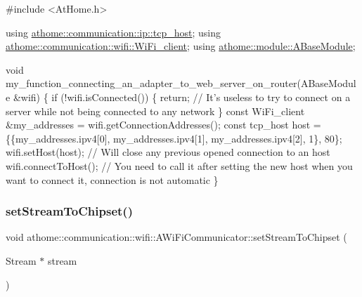 \begin{DoxyCode}
\textcolor{preprocessor}{#include <AtHome.h>}

\textcolor{keyword}{using} \mbox{\hyperlink{structathome_1_1communication_1_1ip_1_1s__host}{athome::communication::ip::tcp\_host}};
\textcolor{keyword}{using} \mbox{\hyperlink{structathome_1_1communication_1_1wifi_1_1s__wifi__client}{athome::communication::wifi::WiFi\_client}};
\textcolor{keyword}{using} \mbox{\hyperlink{classathome_1_1module_1_1_a_base_module}{athome::module::ABaseModule}};

\textcolor{keywordtype}{void} my\_function\_connecting\_an\_adapter\_to\_web\_server\_on\_router(ABaseModule &wifi) \{
  \textcolor{keywordflow}{if} (!wifi.isConnected()) \{
    \textcolor{keywordflow}{return}; \textcolor{comment}{// It's useless to try to connect on a server while not being connected to any network}
  \}
  \textcolor{keyword}{const} WiFi\_client &my\_addresses = wifi.getConnectionAddresses();
  \textcolor{keyword}{const} tcp\_host host = \{\{my\_addresses.ipv4[0], my\_addresses.ipv4[1], my\_addresses.ipv4[2], 1\}, 80\};
  wifi.setHost(host); \textcolor{comment}{// Will close any previous opened connection to an host}
  wifi.connectToHost(); \textcolor{comment}{// You need to call it after setting the new host when you want to connect it,
       connection is not automatic}
\}
\end{DoxyCode}
 \mbox{\label{classathome_1_1communication_1_1wifi_1_1_a_wi_fi_communicator_a42f2ad88713db57bd9e9670f090924de}} 
\subsubsection{\texorpdfstring{set\+Stream\+To\+Chipset()}{setStreamToChipset()}}
{\footnotesize\ttfamily void athome\+::communication\+::wifi\+::\+A\+Wi\+Fi\+Communicator\+::set\+Stream\+To\+Chipset (\begin{DoxyParamCaption}\item[{Stream $\ast$}]{stream }\end{DoxyParamCaption})}

